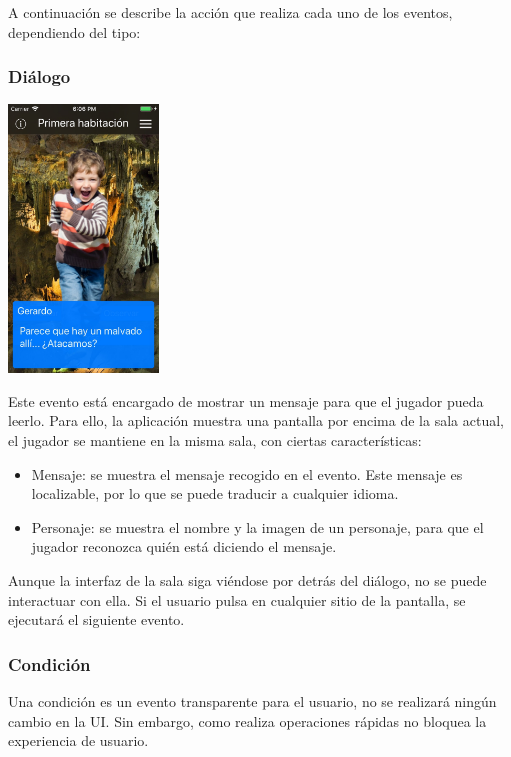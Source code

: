 A continuación se describe la acción que realiza cada uno de los eventos, dependiendo del tipo:

\subsubsection{Diálogo}
\begin{center}
	\includegraphics[width=0.3\textwidth]{include/snapshots/dialogue.jpg}
\end{center}
Este evento está encargado de mostrar un mensaje para que el jugador pueda leerlo. Para ello, la aplicación muestra una pantalla por encima de la sala actual, el jugador se mantiene en la misma sala, con ciertas características:

\begin{itemize}
	\item Mensaje: se muestra el mensaje recogido en el evento. Este mensaje es localizable, por lo que se puede traducir a cualquier idioma.
	\item Personaje: se muestra el nombre y la imagen de un personaje, para que el jugador reconozca quién está diciendo el mensaje.
\end{itemize}

Aunque la interfaz de la sala siga viéndose por detrás del diálogo, no se puede interactuar con ella.
Si el usuario pulsa en cualquier sitio de la pantalla, se ejecutará el siguiente evento.

\subsubsection{Condición}
Una condición es un evento transparente para el usuario, no se realizará ningún cambio en la UI. Sin embargo, como realiza operaciones rápidas no bloquea la experiencia de usuario.

